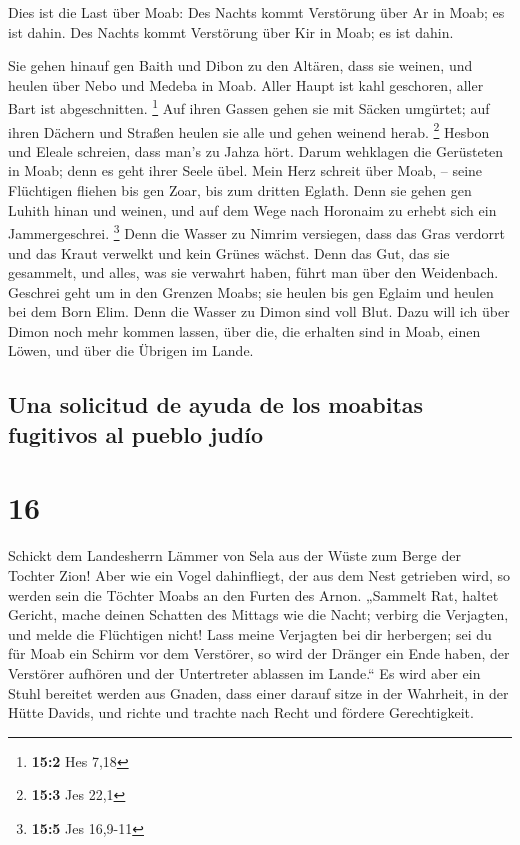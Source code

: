  Dies ist die Last über Moab: Des Nachts kommt Verstörung
über Ar in Moab; es ist dahin. Des Nachts kommt Verstörung über Kir in
Moab; es ist dahin.

 Sie gehen hinauf gen Baith und Dibon zu den Altären, dass
sie weinen, und heulen über Nebo und Medeba in Moab. Aller Haupt ist
kahl geschoren, aller Bart ist abgeschnitten. \footnote{\textbf{15:2}
  Hes 7,18}  Auf ihren Gassen gehen sie mit Säcken
umgürtet; auf ihren Dächern und Straßen heulen sie alle und gehen
weinend herab. \footnote{\textbf{15:3} Jes 22,1}  Hesbon
und Eleale schreien, dass man's zu Jahza hört. Darum wehklagen die
Gerüsteten in Moab; denn es geht ihrer Seele übel.  Mein
Herz schreit über Moab, -- seine Flüchtigen fliehen bis gen Zoar, bis
zum dritten Eglath. Denn sie gehen gen Luhith hinan und weinen, und auf
dem Wege nach Horonaim zu erhebt sich ein Jammergeschrei. \footnote{\textbf{15:5}
  Jes 16,9-11}  Denn die Wasser zu Nimrim versiegen, dass
das Gras verdorrt und das Kraut verwelkt und kein Grünes wächst.
 Denn das Gut, das sie gesammelt, und alles, was sie
verwahrt haben, führt man über den Weidenbach.  Geschrei
geht um in den Grenzen Moabs; sie heulen bis gen Eglaim und heulen bei
dem Born Elim.  Denn die Wasser zu Dimon sind voll Blut.
Dazu will ich über Dimon noch mehr kommen lassen, über die, die erhalten
sind in Moab, einen Löwen, und über die Übrigen im Lande.

\hypertarget{una-solicitud-de-ayuda-de-los-moabitas-fugitivos-al-pueblo-juduxedo}{%
\subsection{Una solicitud de ayuda de los moabitas fugitivos al pueblo
judío}\label{una-solicitud-de-ayuda-de-los-moabitas-fugitivos-al-pueblo-juduxedo}}

\hypertarget{section-15}{%
\section{16}\label{section-15}}

 Schickt dem Landesherrn Lämmer von Sela aus der Wüste zum
Berge der Tochter Zion!  Aber wie ein Vogel dahinfliegt,
der aus dem Nest getrieben wird, so werden sein die Töchter Moabs an den
Furten des Arnon.  „Sammelt Rat, haltet Gericht, mache
deinen Schatten des Mittags wie die Nacht; verbirg die Verjagten, und
melde die Flüchtigen nicht!  Lass meine Verjagten bei dir
herbergen; sei du für Moab ein Schirm vor dem Verstörer, so wird der
Dränger ein Ende haben, der Verstörer aufhören und der Untertreter
ablassen im Lande.``  Es wird aber ein Stuhl bereitet
werden aus Gnaden, dass einer darauf sitze in der Wahrheit, in der Hütte
Davids, und richte und trachte nach Recht und fördere Gerechtigkeit.

